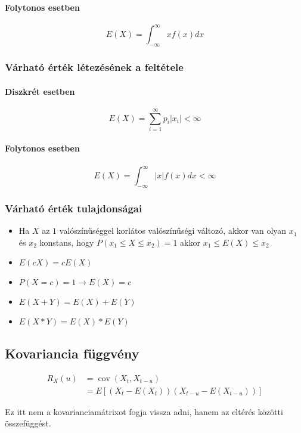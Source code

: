 \documentclass[11pt,a4paper]{article}
\begin{document}
				\paragraph{Folytonos esetben}
					$$E(X) = \int_{-\infty}^{\infty}x f(x)dx$$
				\subsubsection{Várható érték létezésének a feltétele}
					\paragraph{Diszkrét esetben}
						$$E(X) = \sum_{i=1}^{\infty}p_i |x_i| < \infty$$
					\paragraph{Folytonos esetben}
						$$E(X) = \int_{-\infty}^{\infty}|x| f(x)dx < \infty$$
	
				\subsubsection{Várható érték tulajdonságai}
					\begin{itemize}
						\item Ha $X$ az $1$ valószínűséggel korlátos valószínűségi változó, akkor van olyan $x_1$ és $x_2$ konstans, hogy $P(x_1 \le X \le x_2)=1$ akkor $x_1 \le E(X) \le x_2$
						\item $E(cX)=cE(X)$
						\item $P(X=c) = 1 \to E(X)=c$
						\item $E(X+Y) = E(X) + E(Y)$
						\item $E(X*Y)=E(X)*E(Y)$
					\end{itemize}
	
			\subsection{Kovariancia függvény}
				$$ \begin{aligned}
					R_X(u) &= \operatorname{cov}(X_t, X_{t-u}) \\
					&= E[(X_t - E(X_t))(X_{t-u}-E(X_{t-u}))]
				\end{aligned} $$
	
				Ez itt nem a kovarianciamátrixot fogja vissza adni, hanem az eltérés közötti összefüggést.
\end{document}
